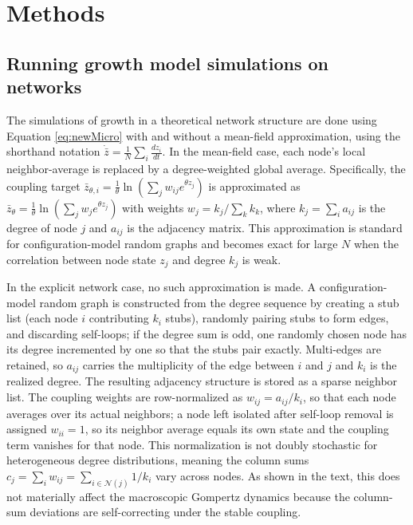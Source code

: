 \documentclass{article}
\begin{document}
\section{Methods}

\subsection{Running growth model simulations on networks}

The simulations of growth in a theoretical network structure are done using Equation \ref{eq:newMicro} with and without a mean-field approximation, using the shorthand notation $\dot{\bar{z}}=\frac{1}{N}\sum_i\frac{dz_i}{dt}$. In the mean-field case, each node's local neighbor-average is replaced by a degree-weighted global average. Specifically, the coupling target $\bar{z}_{\theta,i} = \frac{1}{\theta}\ln(\sum_j w_{ij} e^{\theta z_j})$ is approximated as $\bar{z}_\theta = \frac{1}{\theta}\ln(\sum_j w_j e^{\theta z_j})$ with weights $w_j = k_j / \sum_k k_k$, where $k_j = \sum_i a_{ij}$ is the degree of node $j$ and $a_{ij}$ is the adjacency matrix. This approximation is standard for configuration-model random graphs and becomes exact for large $N$ when the correlation between node state $z_j$ and degree $k_j$ is weak.

In the explicit network case, no such approximation is made. A configuration-model random graph is constructed from the degree sequence by creating a stub list (each node $i$ contributing $k_i$ stubs), randomly pairing stubs to form edges, and discarding self-loops; if the degree sum is odd, one randomly chosen node has its degree incremented by one so that the stubs pair exactly. Multi-edges are retained, so $a_{ij}$ carries the multiplicity of the edge between $i$ and $j$ and $k_i$ is the realized degree. The resulting adjacency structure is stored as a sparse neighbor list. The coupling weights are row-normalized as $w_{ij} = a_{ij}/k_i$, so that each node averages over its actual neighbors; a node left isolated after self-loop removal is assigned $w_{ii} = 1$, so its neighbor average equals its own state and the coupling term vanishes for that node. This normalization is not doubly stochastic for heterogeneous degree distributions, meaning the column sums $c_j = \sum_i w_{ij} = \sum_{i \in \mathcal{N}(j)} 1/k_i$ vary across nodes. As shown in the text, this does not materially affect the macroscopic Gompertz dynamics because the column-sum deviations are self-correcting under the stable coupling.
\end{document}
